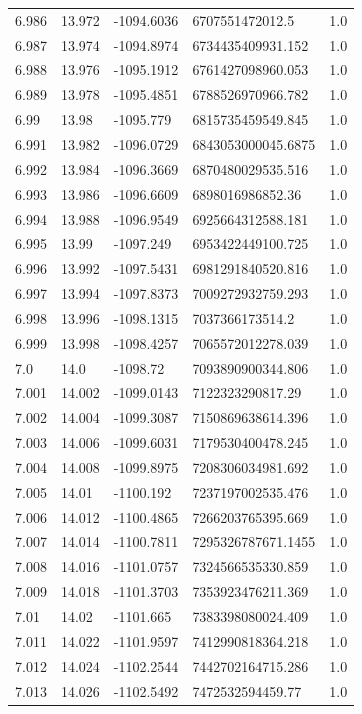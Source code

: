 \begin{tabular}{lllll}
6.986 & 13.972 & -1094.6036 & 6707551472012.5 & 1.0 \\
6.987 & 13.974 & -1094.8974 & 6734435409931.152 & 1.0 \\
6.988 & 13.976 & -1095.1912 & 6761427098960.053 & 1.0 \\
6.989 & 13.978 & -1095.4851 & 6788526970966.782 & 1.0 \\
6.99 & 13.98 & -1095.779 & 6815735459549.845 & 1.0 \\
6.991 & 13.982 & -1096.0729 & 6843053000045.6875 & 1.0 \\
6.992 & 13.984 & -1096.3669 & 6870480029535.516 & 1.0 \\
6.993 & 13.986 & -1096.6609 & 6898016986852.36 & 1.0 \\
6.994 & 13.988 & -1096.9549 & 6925664312588.181 & 1.0 \\
6.995 & 13.99 & -1097.249 & 6953422449100.725 & 1.0 \\
6.996 & 13.992 & -1097.5431 & 6981291840520.816 & 1.0 \\
6.997 & 13.994 & -1097.8373 & 7009272932759.293 & 1.0 \\
6.998 & 13.996 & -1098.1315 & 7037366173514.2 & 1.0 \\
6.999 & 13.998 & -1098.4257 & 7065572012278.039 & 1.0 \\
7.0 & 14.0 & -1098.72 & 7093890900344.806 & 1.0 \\
7.001 & 14.002 & -1099.0143 & 7122323290817.29 & 1.0 \\
7.002 & 14.004 & -1099.3087 & 7150869638614.396 & 1.0 \\
7.003 & 14.006 & -1099.6031 & 7179530400478.245 & 1.0 \\
7.004 & 14.008 & -1099.8975 & 7208306034981.692 & 1.0 \\
7.005 & 14.01 & -1100.192 & 7237197002535.476 & 1.0 \\
7.006 & 14.012 & -1100.4865 & 7266203765395.669 & 1.0 \\
7.007 & 14.014 & -1100.7811 & 7295326787671.1455 & 1.0 \\
7.008 & 14.016 & -1101.0757 & 7324566535330.859 & 1.0 \\
7.009 & 14.018 & -1101.3703 & 7353923476211.369 & 1.0 \\
7.01 & 14.02 & -1101.665 & 7383398080024.409 & 1.0 \\
7.011 & 14.022 & -1101.9597 & 7412990818364.218 & 1.0 \\
7.012 & 14.024 & -1102.2544 & 7442702164715.286 & 1.0 \\
7.013 & 14.026 & -1102.5492 & 7472532594459.77 & 1.0 \\

\end{tabular}
